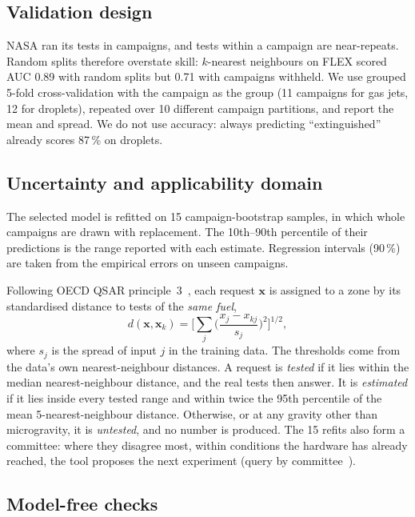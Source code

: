 \documentclass[11pt,twocolumn]{article}
\newcommand{\pct}{\,\%}
\begin{document}
\subsection{Validation design}

NASA ran its tests in campaigns, and tests within a campaign are near-repeats. Random splits therefore
overstate skill: $k$-nearest neighbours on FLEX scored AUC 0.89 with random splits but 0.71 with campaigns
withheld. We use grouped 5-fold cross-validation with the campaign as the group (11 campaigns for gas jets,
12 for droplets), repeated over 10 different campaign partitions, and report the mean and spread. We do not
use accuracy: always predicting ``extinguished'' already scores 87\pct{} on droplets.

\subsection{Uncertainty and applicability domain}

The selected model is refitted on 15 campaign-bootstrap samples, in which whole campaigns are drawn with
replacement. The 10th--90th percentile of their predictions is the range reported with each estimate.
Regression intervals (90\pct) are taken from the empirical errors on unseen campaigns.

Following OECD QSAR principle~3~\cite{oecd2007}, each request $\mathbf{x}$ is assigned to a zone by its
standardised distance to tests of the \emph{same fuel},
\begin{equation}
d(\mathbf{x}, \mathbf{x}_k) = \Big[\sum_j \Big(\frac{x_j - x_{kj}}{s_j}\Big)^2\Big]^{1/2},
\end{equation}
where $s_j$ is the spread of input $j$ in the training data. The thresholds come from the data's own
nearest-neighbour distances. A request is \emph{tested} if it lies within the median nearest-neighbour
distance, and the real tests then answer. It is \emph{estimated} if it lies inside every tested range and
within twice the 95th percentile of the mean 5-nearest-neighbour distance. Otherwise, or at any gravity
other than microgravity, it is \emph{untested}, and no number is produced. The 15 refits also form a
committee: where they disagree most, within conditions the hardware has already reached, the tool proposes
the next experiment (query by committee~\cite{seung1992}).

\subsection{Model-free checks}
\end{document}
